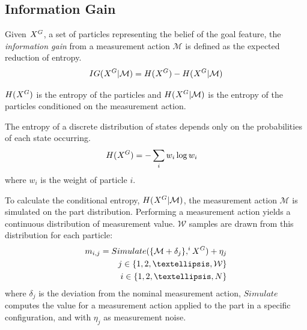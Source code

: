 \documentclass[letterpaper, 10 pt, conference]{ieeeconf}
\newcommand{\maction}{\mathcal{M}}
\newcommand{\measurement}{m}
\newcommand{\totalWeight}{\mathcal{W}}
\begin{document}
\subsection{Information Gain} \label{subsec:IG}
Given $\particles[][][G]$, a set of particles representing the belief of the goal feature, 
the \textit{information gain} from a measurement action $\maction$ is defined as the expected reduction of entropy.
\begin{align}
IG(\particles[][][G]|\maction) = H(\particles[][][G]) - H(\particles[][][G]|\maction)
\end{align}

$H(\particles[][][G])$ is the entropy of the particles and $H(\particles[][][G]|\maction)$ is the entropy of the particles conditioned on the measurement action.

The entropy of a discrete distribution of states depends only on the probabilities of each state occurring. 
\begin{align}
    H(\particles[][][G]) &= -\sum_i {w_i  \log w_i} 
\end{align}
where $w_i$ is the weight of particle $i$.

To calculate the conditional entropy, $H(\particles[][][G]|\maction)$, the measurement action $\maction$ is simulated on the part distribution. Performing a measurement action yields a continuous distribution of measurement value. $\totalWeight$ samples are drawn from this distribution for each particle:
\begin{align}
  \measurement_{i,j} = Simulate(\{\maction + \delta_j\}, \particles[][i][G]) + \eta_j \label{Eq:Simulate}\\
  j\in \{1, 2, \textellipsis, \totalWeight\}\\
  i\in \{1, 2, \textellipsis, N\}
\end{align}
where $\delta_j$ is the deviation from the nominal measurement action, $Simulate$ computes the value for a measurement action applied to the part in a specific configuration, and with $\eta_j$ as measurement noise.
\end{document}
